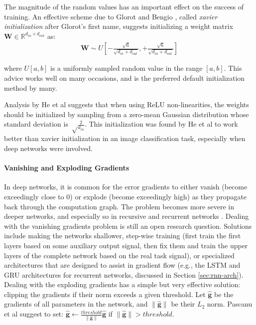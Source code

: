 \documentclass[jair,twoside,11pt,theapa]{article}
\newcommand{\m}[1]{\mathbf{#1}}%
\newcommand{\ygcomment}[1]{\textbf{[TODO: #1]}}
\renewcommand{\ygcomment}[1]{}
\renewcommand{\shortcite}[0]{\citeyear}
\begin{document}
{The magnitude of the random values has an important effect on the
success of training.  An effective scheme due to Glorot and Bengio
\shortcite{glorot2010understanding}, called \emph{xavier initialization} after
Glorot's first name, suggests initializing a weight matrix $\m{W}\in
\mathbb{R}^{d_{in} \times d_{out}}$ as:
\begin{align*}
    \m{W} \sim U\left[ -\frac{\sqrt{6}}{\sqrt{d_{in} + d_{out}}}, +\frac{\sqrt{6}}{\sqrt{d_{in} + d_{out}}}  \right]
\end{align*}

\noindent where $U[a,b]$ is a uniformly sampled random value in the range $[a,b]$. 
This advice works well on many occasions, and is the preferred default
initialization method by many.  

Analysis by He et al \shortcite{he2015delving}
suggests that when using ReLU non-linearities, the weights should be
initialized by sampling from a zero-mean Gaussian distribution whose standard
deviation is $\sqrt\frac{2}{d_{in}}$.
This initialization was found by He et
al to work better than xavier initialization in an image classification task,
especially when deep networks were involved.
\ygcomment{bias and embeddings?}

\paragraph{Vanishing and Exploding Gradients} In deep networks, it is common for
the error gradients to either vanish (become exceedingly close to 0) or explode
(become exceedingly high) as they propagate back through the computation graph.
The problem becomes more severe in deeper networks, and especially so in
recursive and recurrent networks \cite{pascanu2012difficulty}. Dealing with the vanishing gradients problem is
still an open research question. Solutions include making the networks shallower,
step-wise training (first train the first layers based on some auxiliary output signal,
then fix them and train the upper layers of the complete network based on the
real task signal), or specialized architectures that are designed to assist in
gradient flow (e.g., the LSTM and GRU architectures for recurrent networks,
discussed in Section \ref{sec:rnn-arch}).
Dealing with the exploding gradients has a simple but very
effective solution: clipping the gradients if their norm exceeds a given
threshold.  Let $\m{\hat{g}}$ be the gradients of all parameters in the network,
and $\|\m{\hat{g}}\|$ be their $L_2$ norm. Pascanu et al
\shortcite{pascanu2012difficulty} suggest to set: $\m{\hat{g}} \gets
\frac{threshold}{\|\m{\hat{g}}\|}\m{\hat{g}}$ if $\|\m{\hat{g}}\| > threshold$.

}
\end{document}

